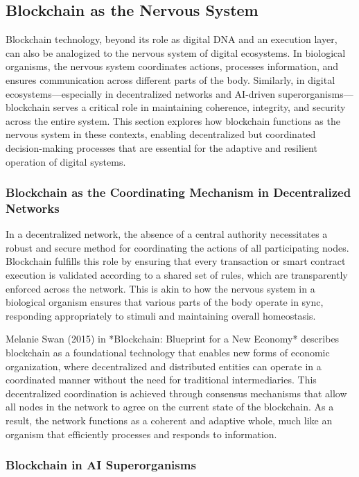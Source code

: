 \documentclass[12pt,twoside]{article}
\begin{document}
\subsection{Blockchain as the Nervous System}

Blockchain technology, beyond its role as digital DNA and an execution layer, can also be analogized to the nervous system of digital ecosystems. In biological organisms, the nervous system coordinates actions, processes information, and ensures communication across different parts of the body. Similarly, in digital ecosystems—especially in decentralized networks and AI-driven superorganisms—blockchain serves a critical role in maintaining coherence, integrity, and security across the entire system. This section explores how blockchain functions as the nervous system in these contexts, enabling decentralized but coordinated decision-making processes that are essential for the adaptive and resilient operation of digital systems.

\subsubsection{Blockchain as the Coordinating Mechanism in Decentralized Networks}

In a decentralized network, the absence of a central authority necessitates a robust and secure method for coordinating the actions of all participating nodes. Blockchain fulfills this role by ensuring that every transaction or smart contract execution is validated according to a shared set of rules, which are transparently enforced across the network. This is akin to how the nervous system in a biological organism ensures that various parts of the body operate in sync, responding appropriately to stimuli and maintaining overall homeostasis.

Melanie Swan (2015) in *Blockchain: Blueprint for a New Economy* describes blockchain as a foundational technology that enables new forms of economic organization, where decentralized and distributed entities can operate in a coordinated manner without the need for traditional intermediaries. This decentralized coordination is achieved through consensus mechanisms that allow all nodes in the network to agree on the current state of the blockchain. As a result, the network functions as a coherent and adaptive whole, much like an organism that efficiently processes and responds to information.

\subsubsection{Blockchain in AI Superorganisms}
\end{document}
